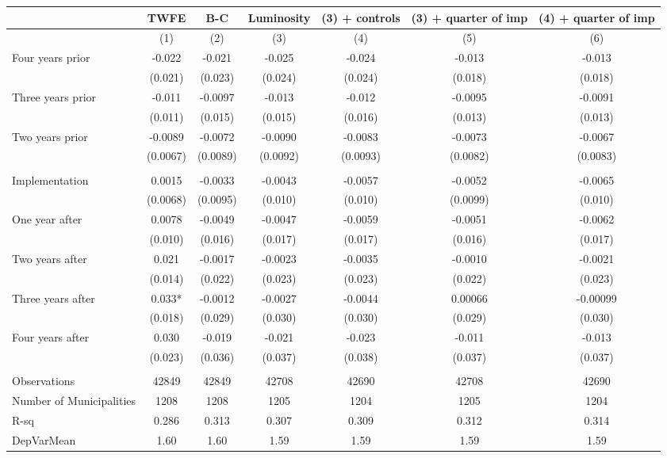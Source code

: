 \begin{tabular}{lcccccc}
\toprule
      & TWFE  & B-C   & Luminosity & (3) + controls & (3) + quarter of imp & (4) + quarter of imp \\
\midrule
      & (1)   & (2)   & (3)   & (4)   & (5)   & (6) \\
\midrule
\midrule
Four years prior & -0.022 & -0.021 & -0.025 & -0.024 & -0.013 & -0.013 \\
      & (0.021) & (0.023) & (0.024) & (0.024) & (0.018) & (0.018) \\
Three years prior & -0.011 & -0.0097 & -0.013 & -0.012 & -0.0095 & -0.0091 \\
      & (0.011) & (0.015) & (0.015) & (0.016) & (0.013) & (0.013) \\
Two years prior & -0.0089 & -0.0072 & -0.0090 & -0.0083 & -0.0073 & -0.0067 \\
      & (0.0067) & (0.0089) & (0.0092) & (0.0093) & (0.0082) & (0.0083) \\
      &       &       &       &       &       &  \\
Implementation & 0.0015 & -0.0033 & -0.0043 & -0.0057 & -0.0052 & -0.0065 \\
      & (0.0068) & (0.0095) & (0.010) & (0.010) & (0.0099) & (0.010) \\
One year after & 0.0078 & -0.0049 & -0.0047 & -0.0059 & -0.0051 & -0.0062 \\
      & (0.010) & (0.016) & (0.017) & (0.017) & (0.016) & (0.017) \\
Two years after & 0.021 & -0.0017 & -0.0023 & -0.0035 & -0.0010 & -0.0021 \\
      & (0.014) & (0.022) & (0.023) & (0.023) & (0.022) & (0.023) \\
Three years after & 0.033* & -0.0012 & -0.0027 & -0.0044 & 0.00066 & -0.00099 \\
      & (0.018) & (0.029) & (0.030) & (0.030) & (0.029) & (0.030) \\
Four years after & 0.030 & -0.019 & -0.021 & -0.023 & -0.011 & -0.013 \\
      & (0.023) & (0.036) & (0.037) & (0.038) & (0.037) & (0.037) \\
      &       &       &       &       &       &  \\
\midrule
Observations & 42849 & 42849 & 42708 & 42690 & 42708 & 42690 \\
Number of Municipalities & 1208  & 1208  & 1205  & 1204  & 1205  & 1204 \\
R-sq  & 0.286 & 0.313 & 0.307 & 0.309 & 0.312 & 0.314 \\
DepVarMean & 1.60  & 1.60  & 1.59  & 1.59  & 1.59  & 1.59 \\
\bottomrule
\bottomrule
\end{tabular}%
